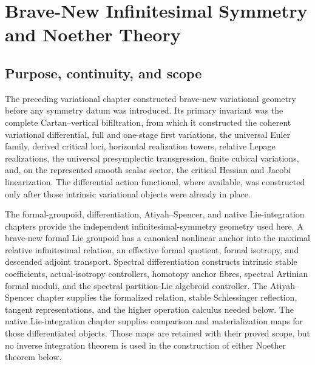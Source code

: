 \chapter{Brave-New Infinitesimal Symmetry and Noether Theory}
\label{ch:symmetry-noether}

\section{Purpose, continuity, and scope}
\label{sec:symmetry-noether-purpose-continuity-and-scope}

The preceding variational chapter constructed brave-new variational geometry before
any symmetry datum was introduced.  Its primary invariant was the complete
Cartan--vertical bifiltration, from which it constructed the coherent variational
differential, full and one-stage first variations, the universal Euler family,
derived critical loci, horizontal realization towers, relative Lepage realizations,
the universal presymplectic transgression, finite cubical variations, and, on the
represented smooth scalar sector, the critical Hessian and Jacobi linearization.
The differential action functional, where available, was constructed only after
those intrinsic variational objects were already in place.

The formal-groupoid, differentiation, Atiyah--Spencer, and native Lie-integration
chapters provide the independent infinitesimal-symmetry geometry used here.  A
brave-new formal Lie groupoid has a canonical nonlinear anchor into the maximal
relative infinitesimal relation, an effective formal quotient, formal isotropy, and
descended adjoint transport.  Spectral differentiation constructs intrinsic stable
coefficients, actual-isotropy controllers, homotopy anchor fibres, spectral
Artinian formal moduli, and the spectral partition-Lie algebroid controller.  The
Atiyah--Spencer chapter supplies the formalized relation, stable Schlessinger
reflection, tangent representations, and the higher operation calculus needed
below.  The native Lie-integration chapter supplies comparison and materialization
maps for those differentiated objects.  Those maps are retained with their proved
scope, but no inverse integration theorem is used in the construction of either
Noether theorem below.

